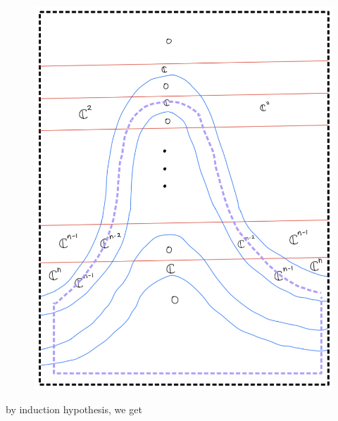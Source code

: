 \begin{enumerate}[label = (\roman*)]
\begin{enumerate}[label = (Step \arabic*)]
\begin{figure}[H]
    \centering
    \includegraphics[scale = 0.95]{diagrams/cobord_inter/4.png}
    \caption{}
    \label{fig:your-label}
\end{figure}
\pagebreak
by induction hypothesis, we get


\end{enumerate}
\end{enumerate}
